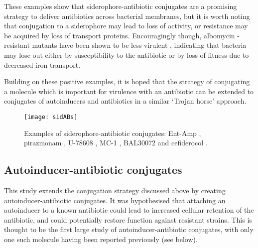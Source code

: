 These examples show that siderophore-antibiotic conjugates are a promising strategy to deliver antibiotics across bacterial membranes, but it is worth noting that conjugation to a siderophore may lead to loss of activity, or resistance may be acquired by loss of transport proteins. Encouragingly though, albomycin -resistant mutants have been shown to be less virulent \cite{Pramanik2007}, indicating that bacteria may lose out either by susceptibility to the antibiotic or by loss of fitness due to decreased iron transport. 

Building on these positive examples, it is hoped that the strategy of conjugating a molecule which is important for virulence\cite{Vasil1999} with an antibiotic can be extended to conjugates of autoinducers and antibiotics in a similar `Trojan horse' approach.

\begin{figure}[H]
	\begin{center}
		\texttt{[image: sidABs]}
		\caption{Examples of siderophore-antibiotic conjugates: Ent-Amp \cite{Zheng2014}, 
		pirazmonam \cite{Zurenko1990,Harrington2012}, 
		U-78608 ,\cite{Zurenko1990,Harrington2012} 
		MC-1 \cite{McPherson2012},  
		BAL30072 \cite{Page2013}
		and cefiderocol \cite{Ito2018,Saisho2018}.
		\label{fgr:synthsidABs}}
	\end{center}
\end{figure}



\subsection{Autoinducer-antibiotic conjugates\label{sec:AIABs}}

This study extends the conjugation strategy discussed above by creating autoinducer-antibiotic conjugates. It was hypothesised that attaching an autoinducer to a known antibiotic could lead to increased cellular retention of the antibiotic, and could potentially restore function against resistant strains. This is thought to be the first large study of autoinducer-antibiotic conjugates, with only one such molecule having been reported previously\cite{Ganguly2011} (see below).

